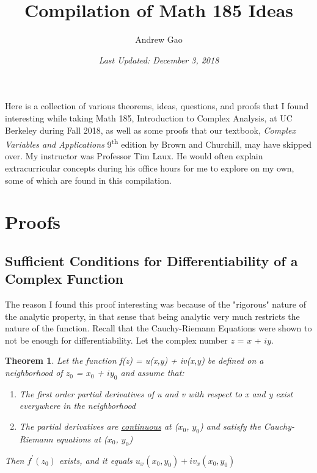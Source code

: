 \documentclass[12pt]{article}
\title{\huge{Compilation of Math 185 Ideas\vspace{1em}}}
\author{\large Andrew Gao \vspace{-10pt}}
\affil{\normalsize{University of California, Berkeley \vspace{10pt}}}
\date{\textsl{\normalsize{Last Updated: December 3, 2018\vspace{1ex}}}}
\newtheorem{theorem}{Theorem}
\theoremstyle{definition}
\theoremstyle{remark}
\begin{document}
\maketitle



Here is a collection of various theorems, ideas, questions, and proofs that I found interesting while taking Math 185, Introduction to Complex Analysis, at UC Berkeley during Fall 2018, as well as some proofs that our textbook, \textit{Complex Variables and Applications} 9\textsuperscript{th} edition by Brown and Churchill, may have skipped over. My instructor was Professor Tim Laux. He would often explain extracurricular concepts during his office hours for me to explore on my own, some of which are found in this compilation.\vspace{1em}

\tableofcontents
\pagebreak

\section{Proofs}
\subsection*{Sufficient Conditions for Differentiability of a Complex Function}
The reason I found this proof interesting was because of the "rigorous" nature of the analytic property, in that sense that being analytic very much restricts the nature of the function. Recall that the Cauchy-Riemann Equations were shown to not be enough for differentiability. Let the complex number $z$ = $x$ + $iy$.


\begin{theorem}
Let the function f(z) = u(x,y) + iv(x,y) be defined on a neighborhood of $z_0$ = $x_0$ + $iy_0$ and assume that:
\begin{enumerate}[label=\Alph*)]
    \item The first order partial derivatives of u and v with respect to x and y exist everywhere in the neighborhood
    \item The partial derivatives are \underline{continuous} at ($x_0$, $y_0$) and satisfy the Cauchy-Riemann equations at ($x_0$, $y_0$)
\end{enumerate}
Then $f^\prime(z_0)$ exists, and it equals $u_x(x_0, y_0) + iv_x(x_0,y_0)$
\end{theorem}
\end{document}
